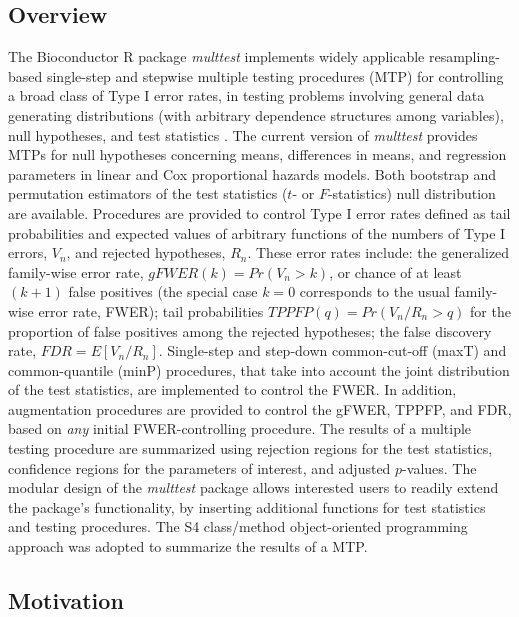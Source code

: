 \documentclass[11pt]{article}
\newcommand{\Rpackage}[1]{\textit{#1}}
\begin{document}
\subsection{Overview}
The Bioconductor R package \Rpackage{multtest} implements widely applicable resampling-based single-step and stepwise multiple testing procedures (MTP) for controlling a broad class of Type I error rates, in testing problems involving general data generating distributions (with arbitrary dependence structures among variables), null hypotheses, and test statistics \cite{Dudoit&vdLaanMTBook,DudoitetalMT1SAGMB04,vdLaanetalMT2SAGMB04,vdLaanetalMT3SAGMB04,Pollard&vdLaanJSPI04}. 
The current version of \Rpackage{multtest} provides MTPs for null hypotheses concerning means, differences in means, and regression parameters in linear and Cox proportional hazards models.
Both bootstrap and permutation estimators of the test statistics ($t$- or $F$-statistics) null distribution are available. 
Procedures are provided to control Type I error rates defined as tail probabilities and expected values of arbitrary functions of the numbers of Type I errors, $V_n$, and rejected hypotheses, $R_n$. 
These error rates include: 
the generalized family-wise error rate, $gFWER(k) = Pr(V_n > k)$, or chance of at least $(k+1)$ false positives (the special case $k=0$ corresponds to the usual family-wise error rate, FWER); 
tail probabilities $TPPFP(q) = Pr(V_n/R_n > q)$ for the proportion of false positives among the rejected hypotheses;
the false discovery rate, $FDR=E[V_n/R_n]$.
Single-step and step-down common-cut-off (maxT) and common-quantile (minP) procedures, that take into account the joint distribution of the test statistics, are implemented to control the FWER. 
In addition, augmentation procedures are provided to control the gFWER, TPPFP, and FDR, based on {\em any} initial FWER-controlling procedure.
The results of a multiple testing procedure are summarized using rejection regions for the test statistics, confidence regions for the parameters of interest, and adjusted $p$-values.
The modular design of the \Rpackage{multtest} package allows interested users to readily extend the package's functionality, by inserting additional functions for test statistics and testing procedures. 
The S4 class/method object-oriented programming approach was adopted to summarize the results of a MTP.

\subsection{Motivation}
\end{document}
